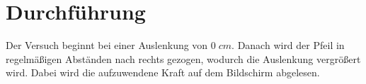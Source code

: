 \section{Durchführung}
\label{sec:Durchführung}
Der Versuch beginnt bei einer Auslenkung von $0 \;cm$. Danach wird der Pfeil 
in regelmäßigen Abständen nach rechts gezogen, wodurch die Auslenkung 
vergrößert wird. Dabei wird die aufzuwendene Kraft auf dem  Bildschirm abgelesen. 